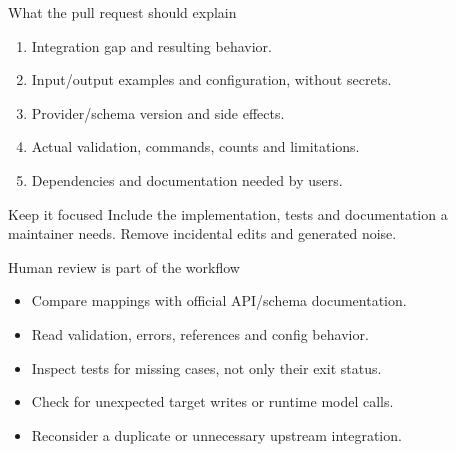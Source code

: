 \begin{frame}{What the pull request should explain}
    \begin{enumerate}
        \item Integration gap and resulting behavior.
        \item Input/output examples and configuration, without secrets.
        \item Provider/schema version and side effects.
        \item Actual validation, commands, counts and limitations.
        \item Dependencies and documentation needed by users.
    \end{enumerate}
    \begin{block}{Keep it focused}
        Include the implementation, tests and documentation a maintainer needs.
        Remove incidental edits and generated noise.
    \end{block}
\end{frame}

\begin{frame}{Human review is part of the workflow}
    \begin{itemize}
        \item Compare mappings with official API/schema documentation.
        \item Read validation, errors, references and config behavior.
        \item Inspect tests for missing cases, not only their exit status.
        \item Check for unexpected target writes or runtime model calls.
        \item Reconsider a duplicate or unnecessary upstream integration.
    \end{itemize}
\end{frame}

